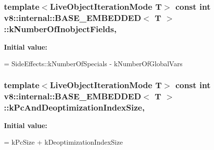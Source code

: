 \subsubsection[{\texorpdfstring{k\+Number\+Of\+Inobject\+Fields}{kNumberOfInobjectFields}}]{\setlength{\rightskip}{0pt plus 5cm}template$<$Live\+Object\+Iteration\+Mode T$>$ const int {\bf v8\+::internal\+::\+B\+A\+S\+E\+\_\+\+E\+M\+B\+E\+D\+D\+ED}$<$ T $>$\+::k\+Number\+Of\+Inobject\+Fields\hspace{0.3cm}{\ttfamily [static]}, {\ttfamily [private]}}\hypertarget{classv8_1_1internal_1_1_b_a_s_e___e_m_b_e_d_d_e_d_a16df0aa78202d19935ed181ea5597a3d}{}\label{classv8_1_1internal_1_1_b_a_s_e___e_m_b_e_d_d_e_d_a16df0aa78202d19935ed181ea5597a3d}
{\bfseries Initial value\+:}
\begin{DoxyCode}
=
      SideEffects::kNumberOfSpecials - kNumberOfGlobalVars
\end{DoxyCode}
\subsubsection[{\texorpdfstring{k\+Pc\+And\+Deoptimization\+Index\+Size}{kPcAndDeoptimizationIndexSize}}]{\setlength{\rightskip}{0pt plus 5cm}template$<$Live\+Object\+Iteration\+Mode T$>$ const int {\bf v8\+::internal\+::\+B\+A\+S\+E\+\_\+\+E\+M\+B\+E\+D\+D\+ED}$<$ T $>$\+::k\+Pc\+And\+Deoptimization\+Index\+Size\hspace{0.3cm}{\ttfamily [static]}, {\ttfamily [private]}}\hypertarget{classv8_1_1internal_1_1_b_a_s_e___e_m_b_e_d_d_e_d_a8a0afe44ca55786d7e0761eb6ac4d958}{}\label{classv8_1_1internal_1_1_b_a_s_e___e_m_b_e_d_d_e_d_a8a0afe44ca55786d7e0761eb6ac4d958}
{\bfseries Initial value\+:}
\begin{DoxyCode}
=
      kPcSize + kDeoptimizationIndexSize
\end{DoxyCode}
